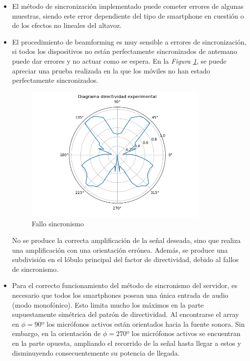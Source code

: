 \documentclass[a4paper,11pt]{book}
\begin{document}
\begin{itemize}

\item El método de sincronización implementado puede cometer errores de algunas muestras, siendo este error dependiente del tipo de smartphone en cuestión o de los efectos no lineales del altavoz.
\item El procedimiento de beamforming es muy sensible a errores de sincronización, si todos los dispositivos no están perfectamente sincronizados de antemano puede dar errores y no actuar como se espera. En la \textit{Figura \ref{error_sincro}}, se puede apreciar una prueba realizada en la que los móviles no han estado perfectamente sincronizados.

\begin{figure}[hbtp]
\centering
\includegraphics[width = 9cm]{FIGURAS/directividad_MALA.png}
\caption{Fallo sincronismo}
\label{error_sincro}
\end{figure}

No se produce la correcta amplificación de la señal deseada, sino que realiza una amplificación con una orientación errónea. Además, se produce una subdivisión en el lóbulo principal del factor de directividad, debido al fallos de sincronismo.

\item Para el correcto funcionamiento del método de sincronismo del servidor, es necesario que todos los smartphones posean una única entrada de audio (modo monofónico). Esto limita mucho los máximos en la parte supuestamente simétrica del patrón de directividad. Al encontrarse el array en $\phi = 90º$ los micrófonos activos están orientados hacia la fuente sonora. Sin embargo, en la orientación de $\phi = 270º$ los micrófonos activos se encuentran en la parte opuesta, ampliando el recorrido de la señal hasta llegar a estos y disminuyendo consecuentemente su potencia de llegada.


\end{itemize}
\end{document}
